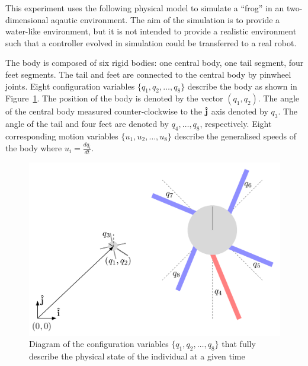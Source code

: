 This experiment uses the following physical model to simulate a
``frog'' in an two-dimensional aqautic environment.  The aim of the
simulation is to provide a water-like environment, but it is not
intended to provide a realistic environment such that a controller
evolved in simulation could be transferred to a real
robot.  

The body is composed of six rigid bodies: one central body, one tail
segment, four feet segments.  The tail and feet are connected to the
central body by pinwheel joints.  Eight configuration variables
$\{q_1, q_2, \ldots, q_8\}$ describe the body as shown in
Figure~\ref{confvars}.  The position of the body is denoted by the
vector $(q_1, q_2)$.  The angle of the central body measured counter-clockwise
to the $\bf \hat j$ axis denoted by $q_3$.  The angle of the tail and
four feet are denoted by $q_4, \ldots, q_8$, respectively.  Eight
corresponding motion variables $\{u_1, u_2, \ldots, u_8\}$ describe
the generalised speeds of the body where $u_i = \frac{d q_i}{d t}$.

\begin{figure}  \label{confvars}
  \begin{center} 
    \includegraphics[scale=0.6]{fig/confvars.pdf} 
  \end{center} 
  \caption[Diagram of the configuration variables]{Diagram of the configuration variables $\{q_1, q_2, \ldots,
    q_8\}$ that fully describe the physical state of the individual at
    a given time}
\end{figure}

